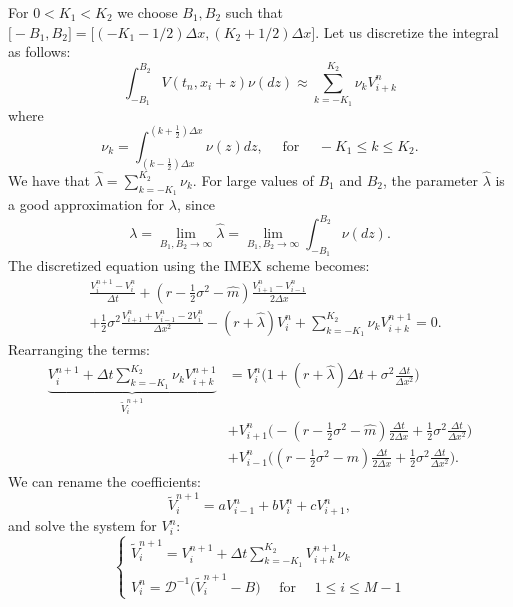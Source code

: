 For $0 < K_1 < K_2$ we choose $B_1,B_2$ such that $ \bigl[-B_1,B_2\bigr] = \bigl[ ( -K_1-1/2 )\Delta x , ( K_2+1/2 )\Delta x \bigr] $.
Let us discretize the integral as follows:
\begin{equation}\label{trap_quad}
 \int_{-B_1}^{B_2}  V(t_n,x_i+z) \nu(dz) \approx \sum_{k = -K_1}^{K_2} \nu_k V^{n}_{i+k}
\end{equation}
where
\begin{equation}\label{nu1}
 \nu_k = \int_{(k-\frac{1}{2}) \Delta x}^{(k+\frac{1}{2}) \Delta x} \nu(z) dz, \hspace{1em} \mbox{ for } \hspace{1em} -K_1 \leq k \leq K_2. 
\end{equation}
We have that $ \hat \lambda = \sum_{k = -K_1}^{K_2} \nu_k $. For large values of $B_1$ and $B_2$, the parameter $\hat \lambda$ is a good approximation for $\lambda$, since
$$\lambda = \lim_{B_1,B_2 \to \infty} \hat \lambda = \lim_{B_1,B_2 \to \infty} \int_{-B_1}^{B_2} \nu(dz).$$
The discretized equation using the IMEX scheme becomes: 
\begin{align}
&\frac{V^{n+1}_{i} -V^{n}_{i}}{\Delta t} + 
(r-\frac{1}{2}\sigma^2 - \hat m) \frac{V^{n}_{i+1} -V^{n}_{i-1}}{ 2 \Delta x} \\ \nonumber
&+ \frac{1}{2} \sigma^2 \frac{V^{n}_{i+1} + V^{n}_{i-1} - 2 V^{n}_{i}}{\Delta x^2}  - (r+\hat \lambda) V^{n}_i +\sum_{k = -K_1}^{K_2} \nu_k V^{n+1}_{i+k} = 0.
\end{align}
Rearranging the terms: 
\begin{align*}
\underbrace{ V^{n+1}_{i} + \Delta t \sum_{k = -K_1}^{K_2} \nu_k V^{n+1}_{i+k} }_{\tilde V^{n+1}_i} &= 
	V^{n}_{i} \biggl( 1 + (r+\hat \lambda)\Delta t + \sigma^2 \frac{\Delta t}{\Delta x^2} \biggr)  \\
& + V^{n}_{i+1} \biggl( -(r -\frac{1}{2}\sigma^2 -\hat m )\frac{\Delta t}{2 \Delta x} +
\frac{1}{2}\sigma^2 \frac{\Delta t}{\Delta x^2}  \biggr)  \\
& + V^{n}_{i-1} \biggl( (r -\frac{1}{2}\sigma^2 - \hat m)\frac{\Delta t}{2 \Delta x} + 
\frac{1}{2}\sigma^2 \frac{\Delta t}{\Delta x^2}  \biggr).
\end{align*}
We can rename the coefficients:
$$ \tilde V^{n+1}_{i} = a V^{n}_{i-1} + b V^{n}_{i} + c V^{n}_{i+1}, $$
and solve the system for $V^{n}_{i}$:
\begin{equation*}
 \begin{cases}
  \tilde V^{n+1}_i = V^{n+1}_{i} + \Delta t \sum_{k = -K_1}^{K_2} V^{n+1}_{i+k} \nu_k \\
  V^{n}_{i} = \mathcal{D}^{-1} \biggl( \tilde V^{n+1}_{i} - B \biggr) \quad \mbox{ for } \quad 1 \leq i \leq M-1  
 \end{cases}
\end{equation*}

